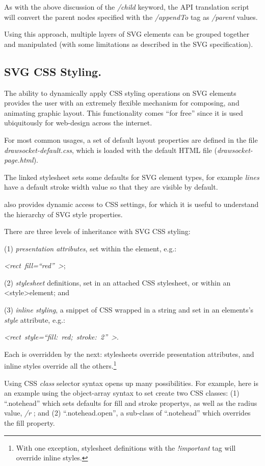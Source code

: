 As with the above discussion of the \textit{/child} keyword, the API translation script will convert the parent nodes specified with the \textit{/appendTo} tag as \textit{/parent} values.

Using this approach, multiple layers of SVG elements can be grouped together and manipulated (with some limitations as described in the SVG specification).

\subsection{SVG CSS Styling.} 
The ability to dynamically apply CSS styling operations on SVG elements provides the user with an extremely flexible mechanism for composing, and animating graphic layout.
This functionality comes ``for free'' since it is used ubiquitously for web-design across the internet.

For most common \drawsocket usages, a set of default layout properties are defined in the file \textit{drawsocket-default.css}, which is loaded with the default HTML file (\textit{drawsocket-page.html}).

The linked stylesheet sets some defaults for SVG element types, for example \textit{lines} have a default stroke width value so that they are visible by default.

\drawsocket also provides dynamic access to CSS settings, for which it is useful to understand the hierarchy of SVG style properties. 

There are three levels of inheritance with SVG CSS styling: 

(1) \textit{presentation attributes}, set within the element, e.g.:

\textit{\textless rect~fill=``red''~\textgreater}; 

(2) \textit{stylesheet} definitions, set in an attached CSS stylesheet, or within an \textless style\textgreater element;
and

(3) \textit{inline styling}, a snippet of CSS wrapped in a string and set in an elements's \textit{style} attribute, e.g.:

\textit{\textless rect~style=``fill:~red;~stroke:~2''~\textgreater}.

Each is overridden by the next: stylesheets override presentation attributes, and inline styles override all the others.\footnote{With one exception, stylesheet definitions with the \textit{!important} tag will override inline styles.} 

Using CSS \textit{class} selector syntax opens up many possibilities.
For example, here is an example using the object-array syntax to set create two CSS classes: (1) ``.notehead'' which sets defaults for fill and stroke propertys, as well as the radius value, \textit{/r} ; and (2) ``.notehead.open'', a sub-class of ``.notehead'' which overrides the fill property. 

